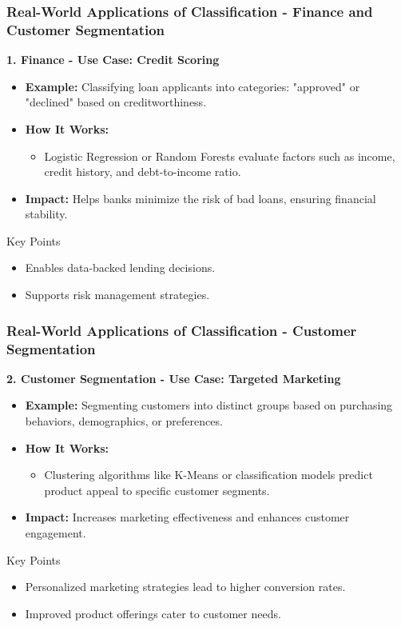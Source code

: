 \documentclass[aspectratio=169]{beamer}
\begin{document}
\begin{frame}[fragile]
    \frametitle{Real-World Applications of Classification - Finance and Customer Segmentation}
    \textbf{1. Finance - Use Case: Credit Scoring}
    \begin{itemize}
        \item \textbf{Example:} Classifying loan applicants into categories: "approved" or "declined" based on creditworthiness.
        \item \textbf{How It Works:} 
        \begin{itemize}
            \item Logistic Regression or Random Forests evaluate factors such as income, credit history, and debt-to-income ratio.
        \end{itemize}
        \item \textbf{Impact:} Helps banks minimize the risk of bad loans, ensuring financial stability.
    \end{itemize}
    \begin{block}{Key Points}
        \begin{itemize}
            \item Enables data-backed lending decisions.
            \item Supports risk management strategies.
        \end{itemize}
    \end{block} 
\end{frame}

\begin{frame}[fragile]
    \frametitle{Real-World Applications of Classification - Customer Segmentation}
    \textbf{2. Customer Segmentation - Use Case: Targeted Marketing}
    \begin{itemize}
        \item \textbf{Example:} Segmenting customers into distinct groups based on purchasing behaviors, demographics, or preferences.
        \item \textbf{How It Works:} 
        \begin{itemize}
            \item Clustering algorithms like K-Means or classification models predict product appeal to specific customer segments.
        \end{itemize}
        \item \textbf{Impact:} Increases marketing effectiveness and enhances customer engagement.
    \end{itemize}
    \begin{block}{Key Points}
        \begin{itemize}
            \item Personalized marketing strategies lead to higher conversion rates.
            \item Improved product offerings cater to customer needs.
        \end{itemize}
    \end{block} 
\end{frame}
\end{document}
